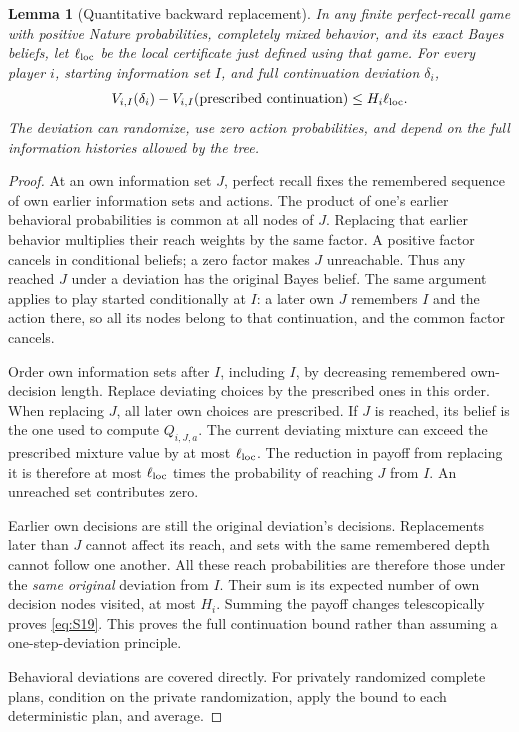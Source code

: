 \documentclass[11pt,a4paper]{article}
\numberwithin{equation}{section}
\newtheorem{lemma}[theorem]{Lemma}
\theoremstyle{definition}
\begin{document}
\begin{lemma}[Quantitative backward replacement]\label{lem:backwardbound}
In any finite perfect-recall game with positive Nature probabilities,
completely mixed behavior, and its exact Bayes beliefs, let
\(\ell_{\rm loc}\) be the local certificate just defined using
that game. For every player \(i\), starting information set \(I\),
and full continuation deviation \(\delta_i\),
\begin{equation}\label{eq:S19}
 V_{i,I}(\delta_i)-V_{i,I}(\text{prescribed continuation})
                         \le H_i\ell_{\rm loc}.
\end{equation}
The deviation can randomize, use zero action probabilities, and depend
on the full information histories allowed by the tree.
\end{lemma}
\begin{proof}
At an own information set \(J\), perfect recall fixes the remembered
sequence of own earlier information sets and actions. The product
of one's earlier behavioral probabilities is common at all nodes
of \(J\). Replacing that earlier behavior multiplies their reach
weights by the same factor. A positive factor cancels in conditional
beliefs; a zero factor makes \(J\) unreachable.
Thus any reached \(J\) under a deviation has the original Bayes belief.
The same argument applies to play started conditionally at \(I\):
a later own \(J\) remembers \(I\) and the action there, so all its
nodes belong to that continuation, and the common factor cancels.

Order own information sets after \(I\), including \(I\), by decreasing
remembered own-decision length. Replace deviating choices by the
prescribed ones in this order. When replacing \(J\), all later own
choices are prescribed. If \(J\) is reached, its belief is the one
used to compute \(Q_{i,J,a}\). The current deviating mixture can
exceed the prescribed mixture value by at most \(\ell_{\rm loc}\).
The reduction in payoff from replacing it is therefore at most
\(\ell_{\rm loc}\) times the probability of reaching \(J\) from \(I\).
An unreached set contributes zero.

Earlier own decisions are still the original deviation's decisions.
Replacements later than \(J\) cannot affect its reach, and sets with
the same remembered depth cannot follow one another.
All these reach probabilities are therefore those under the
\emph{same original} deviation from \(I\).
Their sum is its expected number of own decision nodes visited,
at most \(H_i\). Summing the payoff changes telescopically proves
\eqref{eq:S19}. This proves the full continuation bound rather than
assuming a one-step-deviation principle.

Behavioral deviations are covered directly. For privately randomized
complete plans, condition on the private randomization, apply the
bound to each deterministic plan, and average.
\end{proof}
\end{document}
